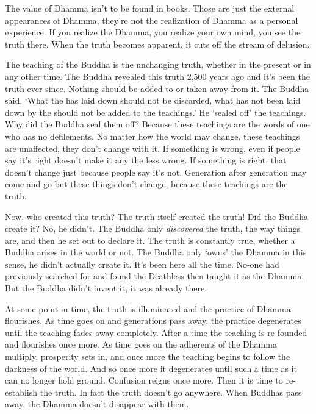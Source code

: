 The value of Dhamma isn't to be found in books. Those are just the external appearances of Dhamma, they're not the realization of Dhamma as a personal experience. If you realize the Dhamma, you realize your own mind, you see the truth there. When the truth becomes apparent, it cuts off the stream of delusion.

The teaching of the Buddha is the unchanging truth, whether in the present or in any other time. The Buddha revealed this truth 2,500 years ago and it's been the truth ever since. Nothing should be added to or taken away from it. The Buddha said, `What the  has laid down should not be discarded, what has not been laid down by the  should not be added to the teachings.' He `sealed off' the teachings. Why did the Buddha seal them off? Because these teachings are the words of one who has no defilements. No matter how the world may change, these teachings are unaffected, they don't change with it. If something is wrong, even if people say it's right doesn't make it any the less wrong. If something is right, that doesn't change just because people say it's not. Generation after generation may come and go but these things don't change, because these teachings are the truth.

Now, who created this truth? The truth itself created the truth! Did the Buddha create it? No, he didn't. The Buddha only \textit{discovered} the truth, the way things are, and then he set out to declare it. The truth is constantly true, whether a Buddha arises in the world or not. The Buddha only `owns' the Dhamma in this sense, he didn't actually create it. It's been here all the time. No-one had previously searched for and found the Deathless then taught it as the Dhamma. But the Buddha didn't invent it, it was already there.

At some point in time, the truth is illuminated and the practice of Dhamma flourishes. As time goes on and generations pass away, the practice degenerates until the teaching fades away completely. After a time the teaching is re-founded and flourishes once more. As time goes on the adherents of the Dhamma multiply, prosperity sets in, and once more the teaching begins to follow the darkness of the world. And so once more it degenerates until such a time as it can no longer hold ground. Confusion reigns once more. Then it is time to re-establish the truth. In fact the truth doesn't go anywhere. When Buddhas pass away, the Dhamma doesn't disappear with them.

